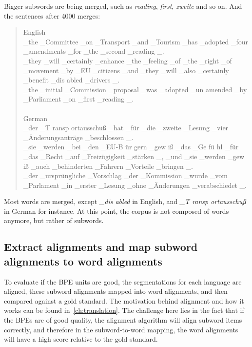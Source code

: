 \clearpage
Bigger subwords are being merged, such as \emph{reading}, \emph{first}, \emph{zweite} and so on. And the sentences after 4000 merges:

\begin{quote}
	English\\
	\_the \_Committee \_on \_Transport \_and \_Tourism \_has \_adopted \_four \_amendments \_for \_the \_second \_reading \_.\\
	\_they \_will \_certainly \_enhance \_the \_feeling \_of \_the \_right \_of \_movement \_by \_EU \_citizens \_and \_they \_will \_also \_certainly \_benefit \_dis abled \_drivers \_.\\
	\_the \_initial \_Commission \_proposal \_was \_adopted \_un amended \_by \_Parliament \_on \_first \_reading \_.\\\\
	German\\
	\_der \_T ransp ortausschuß \_hat \_für \_die \_zweite \_Lesung \_vier \_Änderungsanträge \_beschlossen \_.\\
	\_sie \_werden \_bei \_den \_EU-B ür gern \_gew iß \_das \_Ge fü hl \_für \_das \_Recht \_auf \_Freizügigkeit \_stärken \_, \_und \_sie \_werden \_gew iß \_auch \_behinderten \_Fahrern \_Vorteile \_bringen \_.\\
	\_der \_ursprüngliche \_Vorschlag \_der \_Kommission \_wurde \_vom \_Parlament \_in \_erster \_Lesung \_ohne \_Änderungen \_verabschiedet \_.
\end{quote}

Most words are merged, except \emph{\_dis abled} in English, and \emph{\_T ransp ortausschuß} in German for instance. At this point, the corpus is not composed of words anymore, but rather of subwords.

\subsection{Extract alignments and map subword alignments to word alignments}\label{subsec:extractalign}

To evaluate if the BPE units are good, the segmentations for each language are aligned, these subword alignments mapped into word alignments, and then compared against a gold standard. The motivation behind alignment and how it works can be found in~\ref{ch:translation}. The challenge here lies in the fact that if the BPEs are of good quality, the alignment algorithm will align subword items correctly, and therefore in the subword-to-word mapping, the word alignments will have a high score relative to the gold standard.

